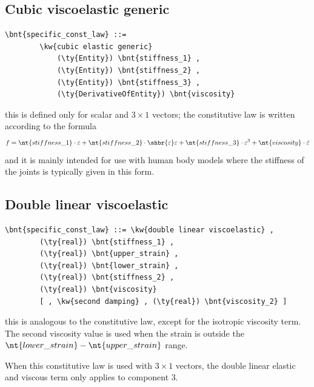 \subsection{Cubic viscoelastic generic}
\begin{Verbatim}[commandchars=\\\{\}]
    \bnt{specific_const_law} ::= 
        \kw{cubic elastic generic}
            (\ty{Entity}) \bnt{stiffness_1} ,
            (\ty{Entity}) \bnt{stiffness_2} ,
            (\ty{Entity}) \bnt{stiffness_3} ,
            (\ty{DerivativeOfEntity}) \bnt{viscosity}
\end{Verbatim}
this is defined only for scalar and $3 \times 1$ vectors; the constitutive
law is written according to the formula
\begin{displaymath}
	f = \nt{stiffness\_1} \cdot \varepsilon
	+ \nt{stiffness\_2} \cdot \shbr{\varepsilon}\varepsilon
	+ \nt{stiffness\_3} \cdot \varepsilon^3
	+ \nt{viscosity} \cdot \dot{\varepsilon}
\end{displaymath}
and it is mainly intended for use with human body models 
where the stiffness of the joints is typically given in this form.

\subsection{Double linear viscoelastic}
\begin{Verbatim}[commandchars=\\\{\}]
    \bnt{specific_const_law} ::= \kw{double linear viscoelastic} ,
        (\ty{real}) \bnt{stiffness_1} ,
        (\ty{real}) \bnt{upper_strain} ,
        (\ty{real}) \bnt{lower_strain} ,
        (\ty{real}) \bnt{stiffness_2} ,
        (\ty{real}) \bnt{viscosity}
        [ , \kw{second damping} , (\ty{real}) \bnt{viscosity_2} ]
\end{Verbatim}
this is analogous to the  constitutive law,
except for the isotropic viscosity term.
The second viscosity value is used when the strain is outside the
$\nt{lower\_strain} - \nt{upper\_strain}$ range.

When this constitutive law is used with $3 \times 1$ vectors, 
the double linear elastic and viscous term only applies to component 3.
  
